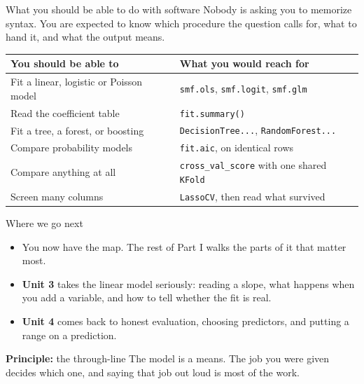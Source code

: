 \documentclass[aspectratio=169]{beamer}
\newenvironment{principle}[1]{\begin{block}{\textbf{Principle:} #1}}{\end{block}}
\begin{document}
\begin{frame}{What you should be able to do with software}
\small
Nobody is asking you to memorize syntax. You are expected to know which procedure the question
calls for, what to hand it, and what the output means.
\begin{center}\footnotesize
\begin{tabular}{L{0.44\textwidth} L{0.46\textwidth}}
\toprule
\textbf{You should be able to} & \textbf{What you would reach for} \\
\midrule
Fit a linear, logistic or Poisson model & \texttt{smf.ols}, \texttt{smf.logit}, \texttt{smf.glm} \\
Read the coefficient table & \texttt{fit.summary()} \\
Fit a tree, a forest, or boosting & \texttt{DecisionTree...}, \texttt{RandomForest...} \\
Compare probability models & \texttt{fit.aic}, on identical rows \\
Compare anything at all & \texttt{cross\_val\_score} with one shared \texttt{KFold} \\
Screen many columns & \texttt{LassoCV}, then read what survived \\
\bottomrule
\end{tabular}
\end{center}
\end{frame}

\begin{frame}{Where we go next}
\begin{itemize}
  \item You now have the map. The rest of Part I walks the parts of it that matter most.
  \item \textbf{Unit 3} takes the linear model seriously: reading a slope, what happens when you
        add a variable, and how to tell whether the fit is real.
  \item \textbf{Unit 4} comes back to honest evaluation, choosing predictors, and putting a
        range on a prediction.
\end{itemize}
\begin{principle}{the through-line}
The model is a means. The job you were given decides which one, and saying that job out loud is
most of the work.
\end{principle}
\end{frame}
\end{document}

